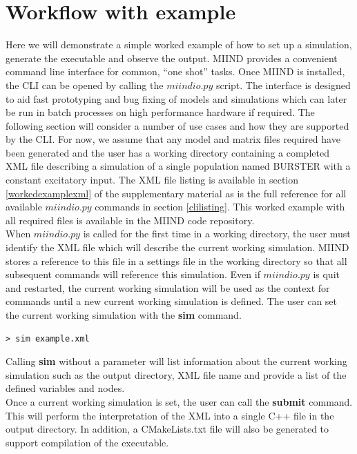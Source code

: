 \documentclass[utf8]{frontiersSCNS} %
\begin{document}
\section{Workflow with example}
\label{workflow}
Here we will demonstrate a simple worked example of how to set up a simulation, generate the executable and observe the output.
MIIND provides a convenient command line interface for common, ``one shot'' tasks. Once MIIND is installed, the CLI can be opened by calling the $miindio.py$ script. The interface is designed to aid fast prototyping and bug fixing of models and simulations which can later be run in batch processes on high performance hardware if required. The following section will consider a number of use cases and how they are supported by the CLI. For now, we assume that any model and matrix files required have been generated and the user has a working directory containing a completed XML file describing a simulation of a single population named BURSTER with a constant excitatory input. The XML file listing is available in section \ref{workedexamplexml} of the supplementary material as is the full reference for all available $miindio.py$ commands in section \ref{clilisting}. This worked example with all required files is available in the MIIND code repository.\\

When $miindio.py$ is called for the first time in a working directory, the user must identify the XML file which will describe the current working simulation. MIIND stores a reference to this file in a settings file in the working directory so that all subsequent commands will reference this simulation. Even if $miindio.py$ is quit and restarted, the current working simulation will be used as the context for commands until a new current working simulation is defined. The user can set the current working simulation with the \textbf{sim} command. \\

\begin{lstlisting}[language=xml]
> sim example.xml
\end{lstlisting}

Calling \textbf{sim} without a parameter will list information about the current working simulation such as the output directory, XML file name and provide a list of the defined variables and nodes.\\
Once a current working simulation is set, the user can call the \textbf{submit} command. This will perform the interpretation of the XML into a single C++ file in the output directory. In addition, a CMakeLists.txt file will also be generated to support compilation of the executable.\\
\end{document}
